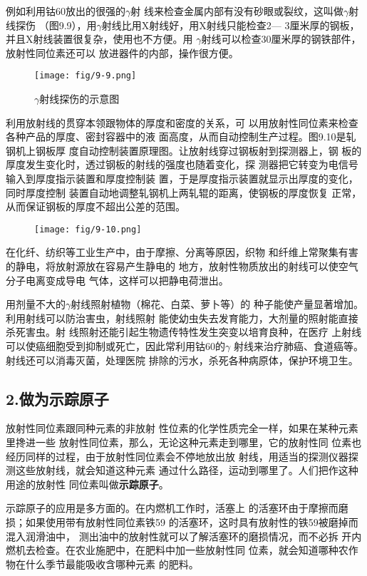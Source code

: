 例如利用钴60放出的很强的$\gamma$射
线来检查金属内部有没有砂眼或裂纹，这叫做$\gamma$射线探伤
（图9.9），用$\gamma$射线比用X射线好，用X射线只能检查2—
3厘米厚的钢板，并且X射线装置很复杂，使用也不方便。用
$\gamma$射线可以检查30厘米厚的钢铁部件，放射性同位素还可以
放进器件的内部，操作很方便。
\begin{figure}[htp]\centering
\texttt{[image: fig/9-9.png]}
\caption{$\gamma$射线探伤的示意图}
\end{figure}

利用放射线的贯穿本领跟物体的厚度和密度的关系，可
以用放射性同位素来检查各种产品的厚度、密封容器中的液
面高度，从而自动控制生产过程。图9.10是轧钢机上钢板厚
度自动控制装置原理图。让放射线穿过钢板射到探测器上，钢
板的厚度发生变化时，透过钢板的射线的强度也随着变化，探
测器把它转变为电信号输入到厚度指示装置和厚度控制装
置，于是厚度指示装置就显示出厚度的变化，同时厚度控制
装置自动地调整轧钢机上两轧辊的距离，使钢板的厚度恢复
正常，从而保证钢板的厚度不超出公差的范围。
\begin{figure}[htp]\centering
\texttt{[image: fig/9-10.png]}
\caption{}
\end{figure}

在化纤、纺织等工业生产中，由于摩擦、分离等原因，织物
和纤维上常聚集有害的静电，将放射源放在容易产生静电的
地方，放射性物质放出的射线可以使空气分子电离变成导电
气体，这样可以把静电荷泄出。

用剂量不大的$\gamma$射线照射植物（棉花、白菜、萝卜等）的
种子能使产量显著增加。利用射线可以防治害虫，射线照射
能使幼虫失去发育能力，大剂量的照射能直接杀死害虫。射
线照射还能引起生物遗传特性发生突变以培育良种，在医疗
上射线可以使癌细胞受到抑制或死亡，因此常利用钴60的$\gamma$
射线来治疗肺癌、食道癌等。射线还可以消毒灭菌，处理医院
排除的污水，杀死各种病原体，保护环境卫生。

\subsection*{2.做为示踪原子}

放射性同位素跟同种元素的非放射
性位素的化学性质完全一样，如果在某种元素里搀进一些
放射性同位素，那么，无论这种元素走到哪里，它的放射性同
位素也经历同样的过程，由于放射性同位素会不停地放出放
射线，用适当的探测仪器探测这些放射线，就会知道这种元素
通过什么路径，运动到哪里了。人们把作这种用途的放射性
同位素叫做\textbf{示踪原子}。

示踪原子的应用是多方面的。在内燃机工作时，活塞上
的活塞环由于摩擦而磨损；如果使用带有放射性同位素铁59
的活塞环，这时具有放射性的铁59被磨掉而混入润滑油中，
测出油中的放射性就可以了解活塞环的磨损情况，而不必拆
开内燃机去检查。在农业施肥中，在肥料中加一些放射性同
位素，就会知道哪种农作物在什么季节最能吸收含哪种元素
的肥料。

